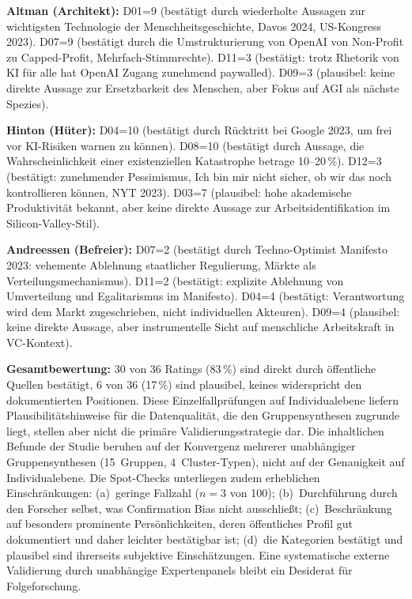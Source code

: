 \documentclass[12pt,a4paper]{article}
\begin{document}
\textbf{Altman (Architekt):} D01=9 (bestätigt durch wiederholte Aussagen zur \glqq wichtigsten Technologie der Menschheitsgeschichte\grqq, Davos 2024, US-Kongress 2023). D07=9 (bestätigt durch die Umstrukturierung von OpenAI von Non-Profit zu Capped-Profit, Mehrfach-Stimmrechte). D11=3 (bestätigt: trotz Rhetorik von \glqq KI für alle\grqq{} hat OpenAI Zugang zunehmend paywalled). D09=3 (plausibel: keine direkte Aussage zur Ersetzbarkeit des Menschen, aber Fokus auf AGI als \glqq nächste Spezies\grqq).

\textbf{Hinton (Hüter):} D04=10 (bestätigt durch Rücktritt bei Google 2023, um frei vor KI-Risiken warnen zu können). D08=10 (bestätigt durch Aussage, die Wahrscheinlichkeit einer existenziellen Katastrophe betrage 10--20\,\%). D12=3 (bestätigt: zunehmender Pessimismus, \glqq Ich bin mir nicht sicher, ob wir das noch kontrollieren können\grqq, NYT 2023). D03=7 (plausibel: hohe akademische Produktivität bekannt, aber keine direkte Aussage zur Arbeitsidentifikation im Silicon-Valley-Stil).

\textbf{Andreessen (Befreier):} D07=2 (bestätigt durch \glqq Techno-Optimist Manifesto\grqq{} 2023: vehemente Ablehnung staatlicher Regulierung, Märkte als Verteilungsmechanismus). D11=2 (bestätigt: explizite Ablehnung von Umverteilung und Egalitarismus im Manifesto). D04=4 (bestätigt: Verantwortung wird dem Markt zugeschrieben, nicht individuellen Akteuren). D09=4 (plausibel: keine direkte Aussage, aber instrumentelle Sicht auf menschliche Arbeitskraft in VC-Kontext).

\textbf{Gesamtbewertung:} 30 von 36 Ratings (83\,\%) sind direkt durch öffentliche Quellen bestätigt, 6 von 36 (17\,\%) sind plausibel, keines widerspricht den dokumentierten Positionen. Diese Einzelfallprüfungen auf Individualebene liefern Plausibilitätshinweise für die Datenqualität, die den Gruppensynthesen zugrunde liegt, stellen aber nicht die primäre Validierungsstrategie dar. Die inhaltlichen Befunde der Studie beruhen auf der Konvergenz mehrerer unabhängiger Gruppensynthesen (15~Gruppen, 4~Cluster-Typen), nicht auf der Genauigkeit auf Individualebene. Die Spot-Checks unterliegen zudem erheblichen Einschränkungen: (a)~geringe Fallzahl ($n=3$ von 100); (b)~Durchführung durch den Forscher selbst, was Confirmation Bias nicht ausschließt; (c)~Beschränkung auf besonders prominente Persönlichkeiten, deren öffentliches Profil gut dokumentiert und daher leichter \glqq bestätigbar\grqq{} ist; (d)~die Kategorien \glqq bestätigt\grqq{} und \glqq plausibel\grqq{} sind ihrerseits subjektive Einschätzungen. Eine systematische externe Validierung durch unabhängige Expertenpanels bleibt ein Desiderat für Folgeforschung.
\end{document}
